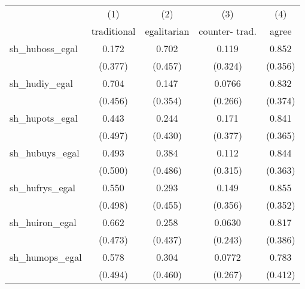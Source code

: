 {
\def\sym#1{\ifmmode^{#1}\else\(^{#1}\)\fi}
\begin{tabular}{l*{4}{c}}
\hline\hline
                    &\multicolumn{1}{c}{(1)}&\multicolumn{1}{c}{(2)}&\multicolumn{1}{c}{(3)}&\multicolumn{1}{c}{(4)}\\
                    &\multicolumn{1}{c}{traditional}&\multicolumn{1}{c}{egalitarian}&\multicolumn{1}{c}{counter- trad.}&\multicolumn{1}{c}{agree}\\
\hline
sh\_huboss\_egal      &       0.172         &       0.702         &       0.119         &       0.852         \\
                    &     (0.377)         &     (0.457)         &     (0.324)         &     (0.356)         \\
[1em]
sh\_hudiy\_egal       &       0.704         &       0.147         &      0.0766         &       0.832         \\
                    &     (0.456)         &     (0.354)         &     (0.266)         &     (0.374)         \\
[1em]
sh\_hupots\_egal      &       0.443         &       0.244         &       0.171         &       0.841         \\
                    &     (0.497)         &     (0.430)         &     (0.377)         &     (0.365)         \\
[1em]
sh\_hubuys\_egal      &       0.493         &       0.384         &       0.112         &       0.844         \\
                    &     (0.500)         &     (0.486)         &     (0.315)         &     (0.363)         \\
[1em]
sh\_hufrys\_egal      &       0.550         &       0.293         &       0.149         &       0.855         \\
                    &     (0.498)         &     (0.455)         &     (0.356)         &     (0.352)         \\
[1em]
sh\_huiron\_egal      &       0.662         &       0.258         &      0.0630         &       0.817         \\
                    &     (0.473)         &     (0.437)         &     (0.243)         &     (0.386)         \\
[1em]
sh\_humops\_egal      &       0.578         &       0.304         &      0.0772         &       0.783         \\
                    &     (0.494)         &     (0.460)         &     (0.267)         &     (0.412)         \\

\end{tabular}}
